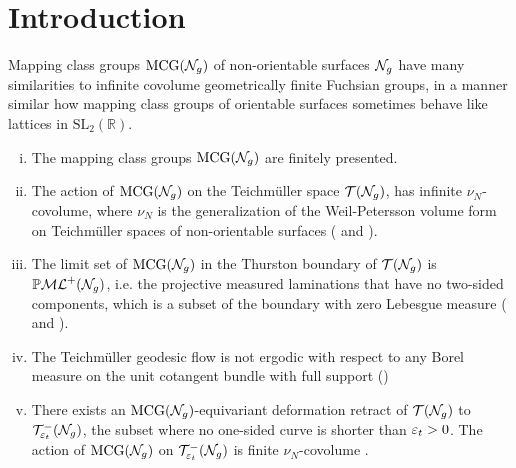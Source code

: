 \section{Introduction}
\label{sec:introduction}


Mapping class groups $\mathrm{MCG}(\mathcal{N}_g)$ of non-orientable surfaces $\mathcal{N}_g$ have many similarities to infinite covolume geometrically finite Fuchsian groups, in a manner similar how mapping class groups of orientable surfaces sometimes behave like lattices in $\mathrm{SL}_2(\mathbb{R})$.

\begin{enumerate}[(i)]
\item The mapping class groups $\mathrm{MCG}(\mathcal{N}_g)$ are finitely presented.
\item The action of $\mathrm{MCG}(\mathcal{N}_g)$ on the Teichmüller space $\mathcal{T}(\mathcal{N}_g)$, has infinite $\nu_N$-covolume, where $\nu_N$ is the generalization of the Weil-Petersson volume form on Teichmüller spaces of non-orientable surfaces (\cite[Theorem 17.1]{gendulphe2017whats} and \cite{norbury2008lengths}).
\item The limit set of $\mathrm{MCG}(\mathcal{N}_g)$ in the Thurston boundary of $\mathcal{T}(\mathcal{N}_g)$ is $\mathbb{P}\mathcal{ML}^+(\mathcal{N}_g)$, i.e. the projective measured laminations that have no two-sided components, which is a subset of the boundary with zero Lebesgue measure (\cite{erlandsson2023mapping} and \cite{limitsetkhan}).
\item The Teichmüller geodesic flow is not ergodic with respect to any Borel measure on the unit cotangent bundle with full support (\cite[Proposition 17.5]{gendulphe2017whats})
\item There exists an $\mathrm{MCG}(\mathcal{N}_g)$-equivariant deformation retract of $\mathcal{T}(\mathcal{N}_g)$ to $\mathcal{T}_{\varepsilon_t}^{-}(\mathcal{N}_g)$, the subset where no one-sided curve is shorter than $\varepsilon_t > 0$. The action of $\mathrm{MCG}(\mathcal{N}_g)$ on $\mathcal{T}_{\varepsilon_t}^{-}(\mathcal{N}_g)$ is finite $\nu_N$-covolume \cite[Proposition 19.1]{gendulphe2017whats}.
\end{enumerate}


